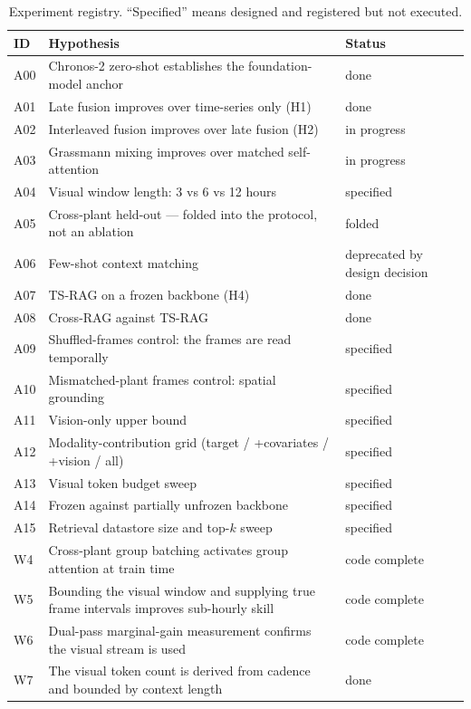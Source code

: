 \begin{table}[h!]
\centering
\small
\begin{tabular}{l p{7.6cm} l}
\hline
\textbf{ID} & \textbf{Hypothesis} & \textbf{Status} \\
\hline
A00 & Chronos-2 zero-shot establishes the foundation-model anchor & done \\
A01 & Late fusion improves over time-series only (H1) & done \\
A02 & Interleaved fusion improves over late fusion (H2) & in progress \\
A03 & Grassmann mixing improves over matched self-attention & in progress \\
A04 & Visual window length: 3 vs 6 vs 12 hours & specified \\
A05 & Cross-plant held-out --- folded into the protocol, not an ablation & folded \\
A06 & Few-shot context matching & deprecated by design decision \\
A07 & TS-RAG on a frozen backbone (H4) & done \\
A08 & Cross-RAG against TS-RAG & done \\
A09 & Shuffled-frames control: the frames are read temporally & specified \\
A10 & Mismatched-plant frames control: spatial grounding & specified \\
A11 & Vision-only upper bound & specified \\
A12 & Modality-contribution grid (target / +covariates / +vision / all) & specified \\
A13 & Visual token budget sweep & specified \\
A14 & Frozen against partially unfrozen backbone & specified \\
A15 & Retrieval datastore size and top-$k$ sweep & specified \\
W4 & Cross-plant group batching activates group attention at train time & code complete \\
W5 & Bounding the visual window and supplying true frame intervals improves sub-hourly skill
& code complete \\
W6 & Dual-pass marginal-gain measurement confirms the visual stream is used & code complete \\
W7 & The visual token count is derived from cadence and bounded by context length & done \\
\hline
\end{tabular}
\caption{Experiment registry. ``Specified'' means designed and registered but not executed.}
\label{tab:registry}
\end{table}


